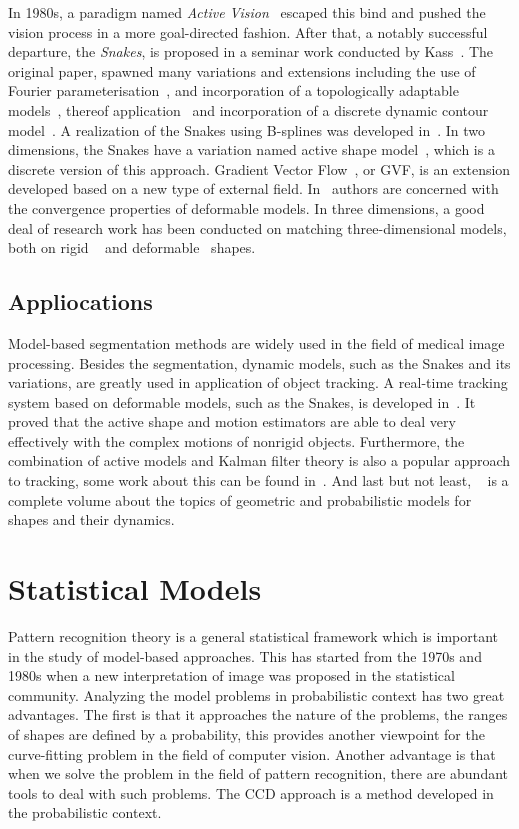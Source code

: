 In 1980s, a paradigm named \textit{Active Vision}~\cite{aloimonos1988active} escaped this bind and
pushed the vision process in a more goal-directed fashion. After that, a
notably successful departure, the \textit{Snakes}, is proposed in a
seminar work conducted by Kass~\cite{kass1988snakes}. The original paper, spawned many variations
and extensions including the use of Fourier
parameterisation~\cite{scott1987alternative}, and incorporation
of a topologically adaptable models~\cite{mcinerney1995topologically},
thereof application~\cite{mcinemey1999topology} and incorporation of a discrete
dynamic contour model~\cite{lobregt1995discrete}. A realization of the
Snakes using B-splines was developed in~\cite{brigger2000b}. In two
dimensions, the Snakes have a variation named active shape
model~\cite{cootes1995active}, which is a discrete version of this
approach. Gradient Vector Flow~\cite{xu1998snakes}, or GVF, is an extension developed
based on a new type of external field. In~\cite{xu2000gradient}
authors are concerned with the convergence properties of deformable
models. In three dimensions, a good deal of research work has been
conducted on matching three-dimensional models, both on rigid
~\cite{harris1993tracking} and deformable~\cite{terzopoulos1991dynamic} shapes.
\subsection{Appliocations}
\label{sec:app}
Model-based segmentation methods are widely used in the field of
medical image processing. Besides the segmentation,
dynamic models, such as the Snakes and its variations, are greatly used in application of object
tracking. A real-time tracking system based on deformable models, such
as the Snakes, is developed
in~\cite{terzopoulos1992tracking}. It proved that the active shape and
motion estimators are able to deal very effectively with the complex
motions of nonrigid objects. Furthermore, the combination of active
models and Kalman filter theory is also a popular approach to
tracking, some work about this can be found
in~\cite{schick1991simultaneous}. And last but not least,
~\cite{blake1998active} is a complete volume about the topics of
geometric and probabilistic models  for shapes and their dynamics.

\section{Statistical Models}
\label{sec:sm}
Pattern recognition theory is a general statistical framework which is
important in the study of model-based approaches. This has started from the 1970s
and 1980s when a new interpretation of image was proposed in the
statistical community.  Analyzing the model problems in probabilistic
context has two great advantages. The first is that it approaches the
nature of the problems, the ranges of shapes are defined by a
probability, this provides another viewpoint for the curve-fitting problem
in the field of computer vision. Another advantage is that when we
solve the problem in the field of pattern recognition, there are abundant tools to deal with such problems. 
The CCD approach is a method developed in the probabilistic context. 

